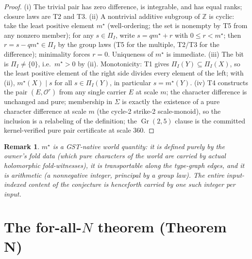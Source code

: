 \documentclass[11pt]{article}
\newtheorem{remark}[theorem]{Remark}
\newcommand{\Oo}{\mathcal{O}}
\newcommand{\Z}{\mathbb{Z}}
\newcommand{\Gr}{\operatorname{Gr}}
\begin{document}
\begin{proof}
(i) The trivial pair has zero difference, is integrable, and has equal ranks;
closure laws are T2 and T3.  (ii) A nontrivial additive subgroup of $\Z$ is
cyclic: take the least positive element $m^\star$ (well-ordering; the set is
nonempty by T5 from any nonzero member); for any $s\in\Pi_I$, write
$s=qm^\star+r$ with $0\le r<m^\star$; then
$r=s-qm^\star\in\Pi_I$ by the group laws (T5 for the multiple, T2/T3 for the
difference); minimality forces $r=0$.  Uniqueness of $m^\star$ is immediate.
(iii) The bit is $\Pi_I\ne\{0\}$, i.e.\ $m^\star>0$ by (ii).  Monotonicity:
T1 gives $\Pi_I(Y)\subseteq\Pi_I(X)$, so the least positive element of the
right side divides every element of the left; with (ii),
$m^\star(X)\mid s$ for all $s\in\Pi_I(Y)$, in particular
$s=m^\star(Y)$.  (iv) T4 constructs the pair $(E,\Oo^{r})$ from any single carrier $E$ at
scale $m$; the character difference is unchanged and pure; membership in
$\Sigma$ is exactly the existence of a pure character difference at scale
$m$ (the cycle-2 strike-2 scale-monoid), so the inclusion is a relabeling of
the definition; the $\Gr(2,5)$ clause is the committed kernel-verified pure
pair certificate \cite{GST-gr25} at scale $360$.
\end{proof}

\begin{remark}
$m^\star$ is a GST-native world quantity: it is defined purely by the owner's
fold data (which pure characters of the world are carried by actual
holomorphic fold-witnesses), it is transportable along the type-graph edges,
and it is arithmetic (a nonnegative integer, principal by a group law).  The
entire input-indexed content of the conjecture is henceforth carried by one
such integer per input.
\end{remark}

\section{The for-all-\texorpdfstring{$N$}{N} theorem (Theorem N)}
\label{sec:forallN}
\end{document}
